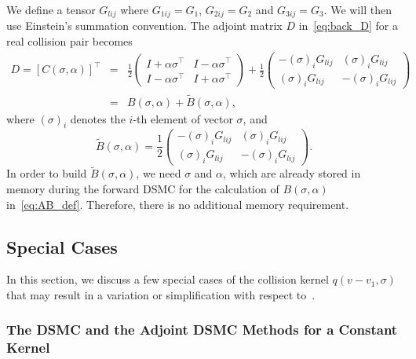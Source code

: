 \documentclass[12pt,nopreprintline]{elsarticle}
\begin{document}
We define a tensor $G_{lij}$ where $G_{1ij} = G_1$, $G_{2ij} = G_2$ and $G_{3ij} = G_3$. We will then use Einstein's summation convention. The adjoint matrix $D$ in~\eqref{eq:back_D} for a real collision pair becomes
\begin{eqnarray}
    D = [C(\sigma, \alpha)]^\top &=& \frac{1}{2} 
 \begin{pmatrix}
 I + \alpha\sigma^\top  &  I - \alpha\sigma^\top \\
  I - \alpha\sigma^\top &  I + \alpha\sigma^\top
\end{pmatrix}  +
\frac{1}{2} 
\begin{pmatrix}
-(\sigma)_i G_{lij}  &  (\sigma)_i G_{lij}  \\
 (\sigma)_i G_{lij}  &  -(\sigma)_i G_{lij} 
\end{pmatrix} 
\nonumber \\
& =& B(\sigma,\alpha)  + \widetilde B(\sigma, \alpha), \label{eq:new D}
\end{eqnarray}
where $(\sigma)_i$ denotes the $i$-th element of vector $\sigma$, and
\begin{equation}\label{eq:tilde B def}
 \widetilde B(\sigma, \alpha) = \frac{1}{2} \begin{pmatrix}
-(\sigma)_i G_{lij}  &  (\sigma)_i G_{lij}  \\
 (\sigma)_i G_{lij}  &  -(\sigma)_i G_{lij} 
 \end{pmatrix}.
\end{equation}
In order to build $\widetilde B(\sigma, \alpha)$, we need $\sigma$ and $\alpha$, which are already stored in memory during the forward DSMC for the calculation of $B(\sigma, \alpha)$ in~\eqref{eq:AB_def}. Therefore, there is no additional memory requirement.





\subsection{Special Cases} \label{subsec:special}
In this section, we discuss a few special cases of the collision kernel $q(v-v_1,\sigma)$ that may result in a variation or simplification with respect to~.

\subsubsection{The DSMC and the Adjoint DSMC Methods for a Constant Kernel}
\end{document}
